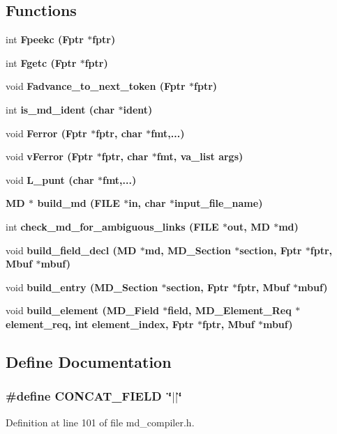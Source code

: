 \subsection*{Functions}
\begin{CompactItemize}
\item 
int \bf{Fpeekc} (\bf{Fptr} $\ast$fptr)
\item 
int \bf{Fgetc} (\bf{Fptr} $\ast$fptr)
\item 
void \bf{Fadvance\_\-to\_\-next\_\-token} (\bf{Fptr} $\ast$fptr)
\item 
int \bf{is\_\-md\_\-ident} (char $\ast$ident)
\item 
void \bf{Ferror} (\bf{Fptr} $\ast$fptr, char $\ast$fmt,...)
\item 
void \bf{v\-Ferror} (\bf{Fptr} $\ast$fptr, char $\ast$fmt, va\_\-list args)
\item 
void \bf{L\_\-punt} (char $\ast$fmt,...)
\item 
\bf{MD} $\ast$ \bf{build\_\-md} (FILE $\ast$in, char $\ast$\bf{input\_\-file\_\-name})
\item 
int \bf{check\_\-md\_\-for\_\-ambiguous\_\-links} (FILE $\ast$out, \bf{MD} $\ast$md)
\item 
void \bf{build\_\-field\_\-decl} (\bf{MD} $\ast$md, \bf{MD\_\-Section} $\ast$section, \bf{Fptr} $\ast$fptr, \bf{Mbuf} $\ast$mbuf)
\item 
void \bf{build\_\-entry} (\bf{MD\_\-Section} $\ast$section, \bf{Fptr} $\ast$fptr, \bf{Mbuf} $\ast$mbuf)
\item 
void \bf{build\_\-element} (\bf{MD\_\-Field} $\ast$field, \bf{MD\_\-Element\_\-Req} $\ast$element\_\-req, int element\_\-index, \bf{Fptr} $\ast$fptr, \bf{Mbuf} $\ast$mbuf)
\end{CompactItemize}


\subsection{Define Documentation}
\subsubsection{\setlength{\rightskip}{0pt plus 5cm}\#define CONCAT\_\-FIELD~\char`\"{}$|$$|$\char`\"{}}\label{md__compiler_8h_5836ed34fa554df2ff49d0eef31bd88a}




Definition at line 101 of file md\_\-compiler.h.

